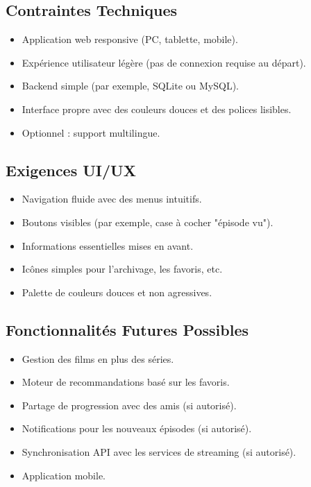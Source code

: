\subsection{Contraintes Techniques}
\begin{itemize}
    \item Application web responsive (PC, tablette, mobile).
    \item Expérience utilisateur légère (pas de connexion requise au départ).
    \item Backend simple (par exemple, SQLite ou MySQL).
    \item Interface propre avec des couleurs douces et des polices lisibles.
    \item Optionnel : support multilingue.
\end{itemize}

\subsection{Exigences UI/UX}
\begin{itemize}
    \item Navigation fluide avec des menus intuitifs.
    \item Boutons visibles (par exemple, case à cocher "épisode vu").
    \item Informations essentielles mises en avant.
    \item Icônes simples pour l'archivage, les favoris, etc.
    \item Palette de couleurs douces et non agressives.
\end{itemize}

\subsection{Fonctionnalités Futures Possibles}
\begin{itemize}
    \item Gestion des films en plus des séries.
    \item Moteur de recommandations basé sur les favoris.
    \item Partage de progression avec des amis (si autorisé).
    \item Notifications pour les nouveaux épisodes (si autorisé).
    \item Synchronisation API avec les services de streaming (si autorisé).
    \item Application mobile.
\end{itemize}

